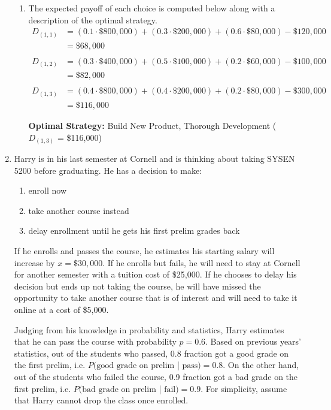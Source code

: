 \documentclass{article}
\begin{document}
\begin{enumerate}
\begin{enumerate}
        \item The expected payoff of each choice is computed below along with a description of the optimal strategy.
        \begin{align*}
            D_{(1,1)} &= (0.1 \cdot \$800{,}000) + (0.3 \cdot \$200{,}000) + (0.6 \cdot \$80{,}000) - \$120{,}000 \\
            &= \$68{,}000 \\ \\
            D_{(1,2)} &= (0.3 \cdot \$400{,}000) + (0.5 \cdot \$100{,}000) + (0.2 \cdot \$60{,}000) - \$100{,}000 \\
            &= \$82{,}000 \\ \\
            D_{(1,3)} &= (0.4 \cdot \$800{,}000) + (0.4 \cdot \$200{,}000) + (0.2 \cdot \$80{,}000) - \$300{,}000 \\
            &= \$116{,}000
        \end{align*}
        
        \textbf{Optimal Strategy:} Build New Product, Thorough Development ($D_{(1,3)}$ = \$116{,}000)\\
    \end{enumerate}
    
    \item Harry is in his last semester at Cornell and is thinking about taking SYSEN 5200 before graduating. He has a decision to make:
    \begin{enumerate}
        \item enroll now
        \item take another course instead
        \item delay enrollment until he gets his first prelim grades back
    \end{enumerate}

    If he enrolls and passes the course, he estimates his starting salary will increase by $x = \$30,000$. If he enrolls but fails, he will need to stay at Cornell for another semester with a tuition cost of \$25,000. If he chooses to delay his decision but ends up not taking the course, he will have missed the opportunity to take another course that is of interest and will need to take it online at a cost of \$5,000.

    Judging from his knowledge in probability and statistics, Harry estimates that he can pass the course with probability $p = 0.6$. Based on previous years’ statistics, out of the students who passed, 0.8 fraction got a good grade on the first prelim, i.e. $P(\text{good grade on prelim } $|$ \text{ pass}) = 0.8$. On the other hand, out of the students who failed the course, 0.9 fraction got a bad grade on the first prelim, i.e. $P(\text{bad grade on prelim } $|$ \text{ fail}) = 0.9$. For simplicity, assume that Harry cannot drop the class once enrolled.


\end{enumerate}
\end{document}
